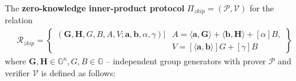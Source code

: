 \documentclass[../lecture-notes-148x210.tex]{subfiles}
\begin{document}
\begin{definition}
    The \textbf{zero-knowledge inner-product protocol} $\Pi_{zkip} = (\mathcal{P,V})$ for the relation 
    \begin{align*}
        \mathcal{R}_{zkip} = \left\{ \begin{aligned} (\mathbf{G,H},G,B,A,V;\mathbf{a,b},\alpha, \gamma) \vert & A = \langle \mathbf{a,G} \rangle + \langle \mathbf{b,H} \rangle + [\alpha] B, \\ & V = [\langle \mathbf{a,b} \rangle]G + [\gamma]B \end{aligned} \right\}
    \end{align*} 
    where $\mathbf{G,H} \in \mathbb{G}^n, G,B \in \mathbb{G}$ -- independent group generators with prover $\mathcal{P}$ and verifier $\mathcal{V}$ is defined as follows:


\end{definition}
\end{document}
